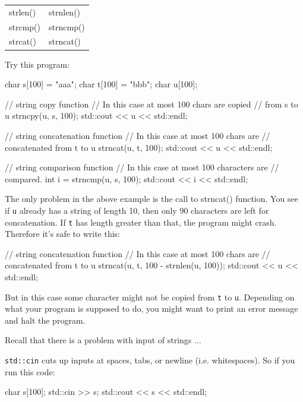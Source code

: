 \begin{tabular}{ll}
strlen() & strnlen() \\
strcmp() & strncmp() \\
strcat() & strncat() \\
\end{tabular}

Try this program:

\begin{consolethree}[escapeinside=||]
char s[100] = "aaa";
char t[100] = "bbb";
char u[100];

// string copy function
// In this case at most 100 chars are copied
// from s to u
strncpy(u, s, 100);
std::cout << u << std::endl;

// string concatenation function
// In this case at most 100 chars are
// concatenated from t to u
strncat(u, t, 100);
std::cout << u << std::endl;

// string comparison function
// In this case at most 100 characters are
// compared.
int i = strncmp(u, s, 100);
std::cout << i << std::endl;
\end{consolethree}

The only problem in the above example is the call to strncat() function. You see if \texttt{u} already has a string of length 10, then only 90 characters are left for concatenation. If \texttt{t} has length greater than that, the program might crash. Therefore it's safe to write this:

\begin{consolethree}[escapeinside=||]
// string concatenation function
// In this case at most 100 chars are
// concatenated from t to u
strncat(u, t, 100 - strnlen(u, 100));
std::cout << u << std::endl;
\end{consolethree}

But in this case some character might not be copied from \texttt{t} to \texttt{u}. Depending on what your program is supposed to do, you might want to print an error message and halt the program.


\newpage{}

Recall that there is a problem with input of strings ...

\texttt{std::cin} cuts up inputs at spaces, tabs, or newline (i.e. whitespaces). So if you run this code:

\begin{consolethree}[escapeinside=||]
char s[100];
std::cin >> s;
std::cout << s << std::endl;
\end{consolethree}

